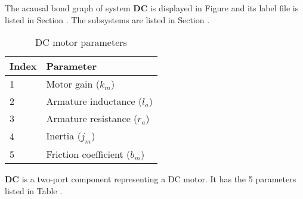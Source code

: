 

   The acausal bond graph of system \textbf{DC} is
   displayed in Figure  and its label
   file is listed in Section .
   The subsystems are listed in Section .

   \begin{table}[htbp]
     \begin{center}
       \leavevmode
       \begin{tabular}{|l|l|}
        \hline
        Index & Parameter\\
        \hline
         1 & Motor gain ($k_m$) \\
         2 & Armature inductance ($l_a$) \\
         3 & Armature resistance ($r_a$) \\
         4 & Inertia ($j_m$) \\
         5 & Friction coefficient ($b_m$) \\
        \hline
       \end{tabular}
       \caption{DC motor parameters}
       \label{tab:DC_components}
     \end{center}
   \end{table}
{\bf DC} is a two-port component representing a DC motor. It has the 5
parameters listed in Table .


